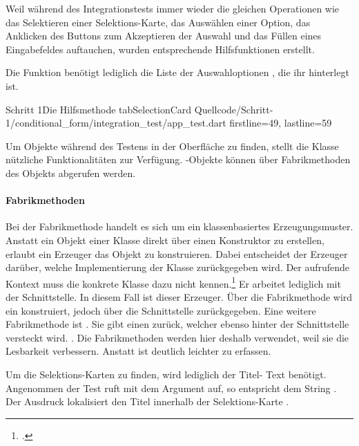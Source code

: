 Weil während des Integrationstests immer wieder die gleichen Operationen wie das Selektieren einer Selektions-Karte, das Auswählen einer Option, das Anklicken des Buttons zum Akzeptieren der Auswahl und das Füllen eines Eingabefeldes auftauchen, wurden entsprechende Hilfsfunktionen erstellt.


Die Funktion  \Lst{\ref{lst:Schritt1HilfsmethodeTabSelectionCard}} benötigt lediglich die Liste der Auswahloptionen , die ihr hinterlegt ist.
 

\begin{alexlisting}{Schritt 1}{Die Hilfsmethode tabSelectionCard}
  {Quellcode/Schritt-1/conditional_form/integration_test/app_test.dart}
  {firstline=49, lastline=59}
  \label{lst:Schritt1HilfsmethodeTabSelectionCard}
\end{alexlisting}

Um Objekte während des Testens in der Oberfläche zu finden, stellt die Klasse  nützliche Funktionalitäten zur Verfügung.
-Objekte können über Fabrikmethoden des Objekts  abgerufen werden.

\paragraph{Fabrikmethoden}
Bei der Fabrikmethode handelt es sich um ein klassenbasiertes Erzeugungsmuster.
Anstatt ein Objekt einer Klasse direkt über einen Konstruktor zu erstellen, erlaubt ein Erzeuger das Objekt zu konstruieren.
Dabei entscheidet der Erzeuger darüber, welche Implementierung der Klasse zurückgegeben wird.
Der aufrufende Kontext muss die konkrete Klasse dazu nicht kennen.\footcite[Vgl.][107-116]{gamma2009entwurfsmuster} Er arbeitet lediglich mit der Schnittstelle. In diesem Fall ist  dieser Erzeuger. Über die Fabrikmethode  wird ein  konstruiert, jedoch über die Schnittstelle  zurückgegeben. Eine weitere Fabrikmethode ist . Sie gibt einen  zurück, welcher ebenso hinter der Schnittstelle  versteckt wird. . Die Fabrikmethoden werden hier deshalb verwendet, weil sie die Lesbarkeit verbessern. Anstatt  ist  deutlich leichter zu erfassen.



Um die Selektions-Karten zu finden, wird lediglich der Titel- Text benötigt.
Angenommen der Test ruft  mit dem Argument  auf, so entspricht  dem String . Der Ausdruck  lokalisiert den Titel innerhalb der Selektions-Karte .

